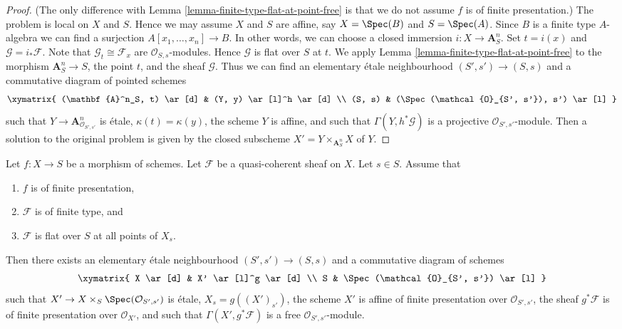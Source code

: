 \begin{proof}
(The only difference with
Lemma \ref{lemma-finite-type-flat-at-point-free}
is that we do not assume $f$ is of finite presentation.)
The problem is local on $X$ and $S$. Hence we may assume $X$ and
$S$ are affine, say $X = \Spec(B)$ and $S = \Spec(A)$.
Since $B$ is a finite type $A$-algebra we can find a surjection
$A[x_1, \ldots, x_n] \to B$. In other words, we can choose a closed
immersion $i : X \to \mathbf{A}^n_S$. Set $t = i(x)$ and
$\mathcal{G} = i_*\mathcal{F}$. Note that $\mathcal{G}_t \cong \mathcal{F}_x$
are $\mathcal{O}_{S, s}$-modules. Hence $\mathcal{G}$ is flat over $S$ at $t$.
We apply
Lemma \ref{lemma-finite-type-flat-at-point-free}
to the morphism $\mathbf{A}^n_S \to S$, the point $t$, and the
sheaf $\mathcal{G}$. Thus we can find an
elementary \'etale neighbourhood $(S', s') \to (S, s)$
and a commutative diagram of pointed schemes
$$
\xymatrix{
(\mathbf{A}^n_S, t) \ar[d] & (Y, y) \ar[l]^h \ar[d] \\
(S, s) & (\Spec(\mathcal{O}_{S', s'}), s') \ar[l]
}
$$
such that $Y \to \mathbf{A}^n_{\mathcal{O}_{S', s'}}$
is \'etale, $\kappa(t) = \kappa(y)$, the scheme $Y$ is
affine, and such that $\Gamma(Y, h^*\mathcal{G})$ is a projective
$\mathcal{O}_{S', s'}$-module. Then a solution to the original
problem is given by the closed subscheme
$X' = Y \times_{\mathbf{A}^n_S} X$ of $Y$.
\end{proof}

\begin{lemma}
\label{lemma-finite-type-flat-along-fibre-free}
Let $f : X \to S$ be a morphism of schemes.
Let $\mathcal{F}$ be a quasi-coherent sheaf on $X$.
Let $s \in S$.
Assume that
\begin{enumerate}
\item $f$ is of finite presentation,
\item $\mathcal{F}$ is of finite type, and
\item $\mathcal{F}$ is flat over $S$ at all points of $X_s$.
\end{enumerate}
Then there exists an elementary \'etale neighbourhood $(S', s') \to (S, s)$
and a commutative diagram of schemes
$$
\xymatrix{
X \ar[d] & X' \ar[l]^g \ar[d] \\
S & \Spec(\mathcal{O}_{S', s'}) \ar[l]
}
$$
such that $X' \to X \times_S \Spec(\mathcal{O}_{S', s'})$
is \'etale, $X_s = g((X')_{s'})$, the scheme $X'$ is
affine of finite presentation over $\mathcal{O}_{S', s'}$,
the sheaf $g^*\mathcal{F}$ is of finite presentation over $\mathcal{O}_{X'}$,
and such that $\Gamma(X', g^*\mathcal{F})$ is a free
$\mathcal{O}_{S', s'}$-module.
\end{lemma}

